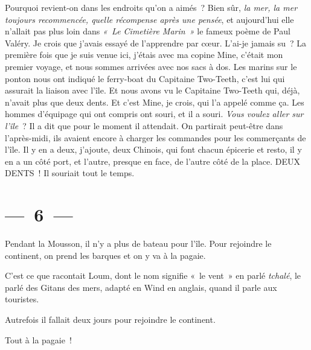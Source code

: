 \documentclass[french,twoside]{book} %
\begin{document}
\noindent Pourquoi revient-on dans les endroits qu’on a aimés ? Bien sûr, \emph{la mer, la mer toujours recommencée, quelle récompense après une pensée}, et aujourd’hui elle n’allait pas plus loin dans\emph{ « Le Cimetière Marin »} le fameux poème de Paul Valéry. Je crois que j’avais essayé de l’apprendre par cœur. L’ai-je jamais su ? La première fois que je suis venue ici, j’étais avec ma copine Mine, c’était mon premier voyage, et nous sommes arrivées avec nos sacs à dos. Les marins sur le ponton nous ont indiqué le ferry-boat du Capitaine Two-Teeth, c’est lui qui assurait la liaison avec l’île. Et nous avons vu le Capitaine Two-Teeth qui, déjà, n’avait plus que deux dents. Et c’est Mine, je crois, qui l’a appelé comme ça. Les hommes d’équipage qui ont compris ont souri, et il a souri. \emph{Vous voulez aller sur l’île} ? Il a dit que pour le moment il attendait. On partirait peut-être dans l’après-midi, ils avaient encore à charger les commandes pour les commerçants de l’île. Il y en a deux, j’ajoute, deux Chinois, qui font chacun épicerie et resto, il y en a un côté port, et l’autre, presque en face, de l’autre côté de la place. DEUX DENTS ! Il souriait tout le temps.

\section[{— 6 —}]{— 6 —}
\renewcommand{\leftmark}{— 6 —}

\noindent Pendant la Mousson, il n’y a plus de bateau pour l’île. Pour rejoindre le continent, on prend les barques et on y va à la pagaie.\par

\begin{center}
\par
\end{center}

\noindent C’est ce que racontait Loum, dont le nom signifie « le vent » en parlé \emph{tchalé}, le parlé des Gitans des mers, adapté en Wind en anglais, quand il parle aux touristes.\par
Autrefois il fallait deux jours pour rejoindre le continent.\par
Tout à la pagaie !\par

\begin{center}
\par
\end{center}
\end{document}
